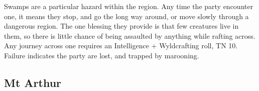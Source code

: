 \begin{multicols}{2}
Swamps are a particular hazard within the region.
Any time the party encounter one, it means they stop, and go the long way around, or move slowly through a dangerous region.
The one blessing they provide is that few creatures live in them, so there is little chance of being assaulted by anything while rafting across.
Any journey across one requires an Intelligence + Wyldcrafting roll, TN 10.
Failure indicates the party are lost, and trapped by marooning.

\subsection{Mt Arthur}

\iftoggle{players}{}{

  \begin{figure*}[t!]
  \begin{nametable}[c||L|L|LLLL|L|L,fontupper=\footnotesize,]{Encounter in Mt Arthur}


\end{nametable}
\end{figure*}}
\end{multicols}
